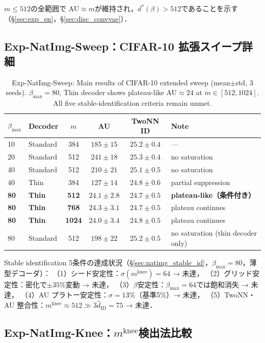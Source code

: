 \documentclass[11pt,a4paper]{jsarticle}
\newcommand{\mknee}{m^{\mathrm{knee}}}
\begin{document}
$m \leq 512$の全範囲で AU$\approx m$が維持され，$d^*(\beta) > 512$であることを示す
（§\ref{sec:exp_en}，§\ref{sec:disc_convvae}）．

\subsection*{Exp-NatImg-Sweep：CIFAR-10 拡張スイープ詳細}

\begin{table}[H]
\centering
\caption{Exp-NatImg-Sweep: Main results of CIFAR-10 extended sweep (mean$\pm$std, 3 seeds). $\beta_\mathrm{max}=80$, Thin decoder shows plateau-like AU$\approx24$ at $m \in [512,1024]$. All five stable-identification criteria remain unmet.}
\label{tab:natimg_sweep}
\small
\begin{tabular}{llcccl}
\toprule
$\beta_{\max}$ & Decoder & $m$ & AU & TwoNN ID & Note \\
\midrule
10 & Standard & 384 & $185\pm15$ & $25.2\pm0.4$ & --- \\
20 & Standard & 512 & $241\pm18$ & $25.3\pm0.4$ & no saturation \\
40 & Standard & 512 & $210\pm21$ & $25.1\pm0.5$ & no saturation \\
40 & Thin      & 384 & $127\pm14$ & $24.8\pm0.6$ & partial suppression \\
\textbf{80} & \textbf{Thin} & \textbf{512} & $\boldsymbol{24.1\pm2.8}$ & $24.7\pm0.5$ & \textbf{plateau-like（条件付き）} \\
\textbf{80} & \textbf{Thin} & \textbf{768} & $\boldsymbol{24.3\pm3.1}$ & $24.7\pm0.5$ & plateau continues \\
\textbf{80} & \textbf{Thin} & \textbf{1024}& $\boldsymbol{24.0\pm3.4}$ & $24.8\pm0.5$ & plateau continues \\
80 & Standard  & 512 & $198\pm22$ & $25.2\pm0.5$ & no saturation (thin decoder only) \\
\bottomrule
\end{tabular}
\end{table}

Stable identification 5条件の達成状況（§\ref{sec:natimg_stable_id}，$\beta_{\max}=80$，薄型デコーダ）：
（1）シード安定性：$\sigma(\mknee)=64$ → 未達，
（2）グリッド安定性：密化で$\pm35\%$変動 → 未達，
（3）$\beta$安定性：$\beta_{\max}=64$では飽和消失 → 未達，
（4）AU プラトー安定性：$\sigma=13\%$（基準5\%）→ 未達，
（5）TwoNN・AU 整合性：$\mknee \approx 512 \gg 3\hat{d}_\mathrm{ID}=75$ → 未達．

\subsection*{Exp-NatImg-Knee：$\mknee$検出法比較}
\end{document}
